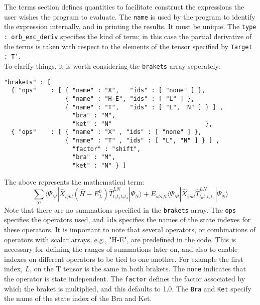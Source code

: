 The terms section defines quantities to facilitate construct the expressions
the user wishes the program to evaluate.  The \texttt{name} is used by the program to
identify the expression internally, and in printing the results. It must be unique. 
The \texttt{type : orb\_exc\_deriv} specifies the kind of term;  in this case the partial
derivative of the terms is taken with respect to the elements of the tensor specified by \texttt{Target : T'}.\\

\noindent To clarify things, it is worth considering the \texttt{brakets} array seperately:

\begin{lstlisting}[label={lst:brakets}]
"brakets" : [
  { "ops"    : [ { "name" : "X",   "ids" : [ "none" ] },
                 { "name" : "H-E", "ids" : [ "L" ] },
                 { "name" : "T",   "ids" : [ "L", "N" ] } ] ,
                   "bra" : "M",
                   "ket" : "N"                          }, 
  { "ops"    : [ { "name" : "X" , "ids" : [ "none" ] },
                 { "name" : "T" , "ids" : [ "L", "N" ] } ] ,
                   "factor" : "shift",
                   "bra" : "M",
                   "ket" : "N" } ] 
\end{lstlisting}         
The above represents the mathematical term:
\begin{equation}
\sum_{T'}
\langle \Psi_{M} |  \hat{X}_{ijkl} ( \hat{H}-E^{0}_{L} ) \hat{T}^{LN}_{ t_{0}t_{1}t_{2}t_{3} } | \Psi_{N} \rangle + 
E_{shift}\langle \Psi_{M} |  \hat{X}_{ijkl}  \hat{T}^{LN}_{ t_{0}t_{1}t_{2}t_{3} }| \Psi_{N} \rangle 
\end{equation}
\noindent Note that there are no summations specified in the \texttt{brakets} array. 
The \texttt{ops} specifies the operators used, and \texttt{ids} specifies the names of the state indexes
for these operators. It is important to note that several operators, or combinations of
operators with scalar arrays, e.g., "H-E", are predefined in the code. 
This is necessary for defining the ranges of summations later on, and also to enable indexes on 
different operators to be tied to one another. For example the first index, $L$, on the T tensor is the same in 
both brakets. The \texttt{none} indicates that the operator is state independent.
The \texttt{factor} defines the factor associated by which the braket is multiplied, and this
defaults to 1.0. The \texttt{Bra} and \texttt{Ket} specify the name of the state index of the Bra and Ket. \\

